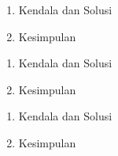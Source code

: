 \begin{enumerate}
\item Kendala dan Solusi

\item Kesimpulan

\end{enumerate}

\begin{enumerate}
\item Kendala dan Solusi

\item Kesimpulan

\end{enumerate}

\begin{enumerate}
\item Kendala dan Solusi

\item Kesimpulan

\end{enumerate}
